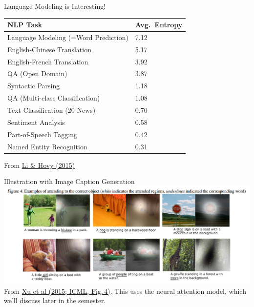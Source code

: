 \documentclass[xcolor=pdftex,x11names,table,hyperref]{beamer}
\newcommand{\tablecolors}{\rowcolors{2}{blue!12}{white}} %
\begin{document}
\begin{frame}{Language Modeling is Interesting!}
 \begin{block}{}

\begin{center}
\begin{small}
\begin{spacing}{1.4}
\tablecolors
\begin{tabular}{l|l}
	\hline
	\bf NLP Task & \bf Avg.\ Entropy \\
	\hline
	\hline
	Language Modeling (=Word Prediction) & 7.12 \\
	English-Chinese Translation & 5.17 \\
	English-French Translation & 3.92 \\
	QA (Open Domain) & 3.87 \\
	Syntactic Parsing & 1.18 \\
	QA (Multi-class Classification) & 1.08 \\
	Text Classification (20 News) & 0.70 \\
	Sentiment Analysis & 0.58 \\
	Part-of-Speech Tagging & 0.42 \\
	Named Entity Recognition & 0.31 \\
	\hline
\end{tabular}
\end{spacing}
\end{small}
\end{center}
\vspace*{-2.3em}
\end{block}
\vspace*{-0.5em}
\tiny{From \href{https://arxiv.org/abs/1503.00168}{Li \& Hovy (2015)}\nocite{li-hovy2015}}
\end{frame}

\begin{frame}{Illustration with Image Caption Generation}
	\includegraphics[width=1.03\textwidth]{images/xu-etal2015_icml_fig4.jpg} \\[1.5em]
	\tiny{From \href{https://arxiv.org/abs/1502.03044}{Xu et al (2015; ICML, Fig.\,4)}\nocite{xu-etal2015}}.  This uses the neural attention model, which we'll discuss later in the semester.
\end{frame}





\end{document}
